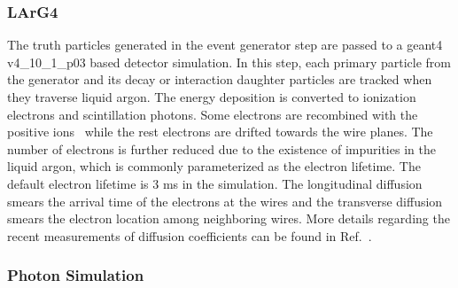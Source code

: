 
\subsubsection{LArG4}

The truth particles generated in the event generator step are passed to a {\sc geant4} v4\_10\_1\_p03 based detector simulation. In this step, each primary particle from the generator and its decay or interaction daughter particles are tracked when they traverse liquid argon. The energy deposition is converted to ionization electrons and scintillation photons. Some electrons are recombined with the positive ions~\cite{Acciarri:2013met,Amoruso:2004dy} while the rest electrons are drifted towards the wire planes. The number of electrons is further reduced due to the existence of impurities in the liquid argon, which is commonly parameterized as the electron lifetime. The default electron lifetime is 3 ms in the simulation. The longitudinal diffusion smears the arrival time of the electrons at the wires and the transverse diffusion smears the electron location among neighboring wires. More details
regarding the recent measurements of diffusion coefficients can be found
in Ref.~\cite{Li:2015rqa,ref:lar_property}.

\subsubsection{Photon Simulation}

